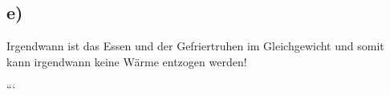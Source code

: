 

\subsection*{e)}
Irgendwann ist das Essen und der Gefriertruhen im Gleichgewicht und somit kann irgendwann keine Wärme entzogen werden!

```